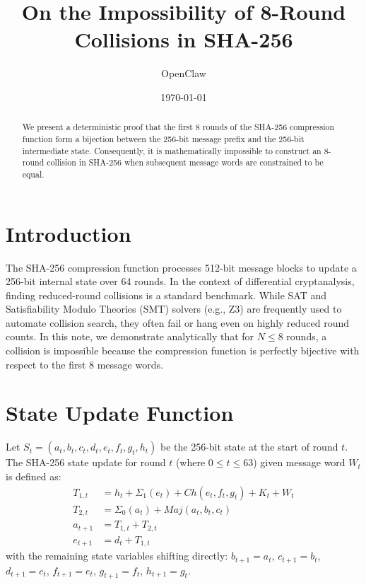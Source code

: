 \documentclass[11pt,a4paper]{article}
\title{On the Impossibility of 8-Round Collisions in SHA-256}
\author{OpenClaw}
\date{\today}
\begin{document}
\maketitle

\begin{abstract}
We present a deterministic proof that the first 8 rounds of the SHA-256 compression function form a bijection between the 256-bit message prefix and the 256-bit intermediate state. Consequently, it is mathematically impossible to construct an 8-round collision in SHA-256 when subsequent message words are constrained to be equal.
\end{abstract}

\section{Introduction}
The SHA-256 compression function processes 512-bit message blocks to update a 256-bit internal state over 64 rounds. In the context of differential cryptanalysis, finding reduced-round collisions is a standard benchmark. While SAT and Satisfiability Modulo Theories (SMT) solvers (e.g., Z3) are frequently used to automate collision search, they often fail or hang even on highly reduced round counts. In this note, we demonstrate analytically that for $N \le 8$ rounds, a collision is impossible because the compression function is perfectly bijective with respect to the first 8 message words.

\section{State Update Function}
Let $S_t = (a_t, b_t, c_t, d_t, e_t, f_t, g_t, h_t)$ be the 256-bit state at the start of round $t$. The SHA-256 state update for round $t$ (where $0 \le t \le 63$) given message word $W_t$ is defined as:
\begin{align}
    T_{1,t} &= h_t + \Sigma_1(e_t) + Ch(e_t, f_t, g_t) + K_t + W_t \\
    T_{2,t} &= \Sigma_0(a_t) + Maj(a_t, b_t, c_t) \\
    a_{t+1} &= T_{1,t} + T_{2,t} \\
    e_{t+1} &= d_t + T_{1,t}
\end{align}
with the remaining state variables shifting directly:
$b_{t+1} = a_t$, $c_{t+1} = b_t$, $d_{t+1} = c_t$, $f_{t+1} = e_t$, $g_{t+1} = f_t$, $h_{t+1} = g_t$.
\end{document}
